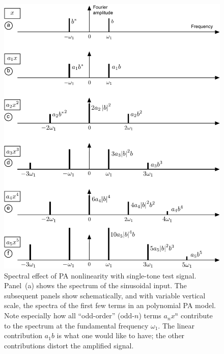 \documentclass[11pt,oneside,a4paper]{scrartcl}
\newcommand{\BL}[1]{\color{blue}#1 \color{black}}
\begin{document}
\begin{figure}
\centering
\includegraphics[width=0.9\linewidth]{fig/pa_1tone}
\caption [pa_1tone] 
{
\BL{Spectral effect of PA nonlinearity with single-tone test signal.}
Panel~(a) shows the spectrum of the sinusoidal input. The subsequent panels show schematically, and with variable vertical scale, the spectra of the first few terms in an polynomial PA model. Note especially how all ``odd-order'' (odd-$n$) terms $a_n x^n$ contribute to the spectrum at the fundamental frequency $\omega_1$. The linear contribution $a_1b$ is what one would like to have; the other contributions distort the amplified signal.
}
\label{Fig:pa_1tone}
\end{figure}
\end{document}
